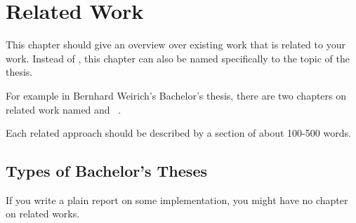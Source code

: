 
\chapter{Related Work} \label{chapter:relatedwork}

This chapter should give an overview over existing work that is
related to your work. Instead of , this chapter can
also be named specifically to the topic of the thesis.

For example in Bernhard Weirich's Bachelor's thesis, there are two
chapters on related work named  and
~\cite{weirich:2005}.

Each related approach should be described by a section of about
100-500 words.

\section{Types of Bachelor's Theses}

If you write a plain report on some implementation, you might have
no chapter on related works.

